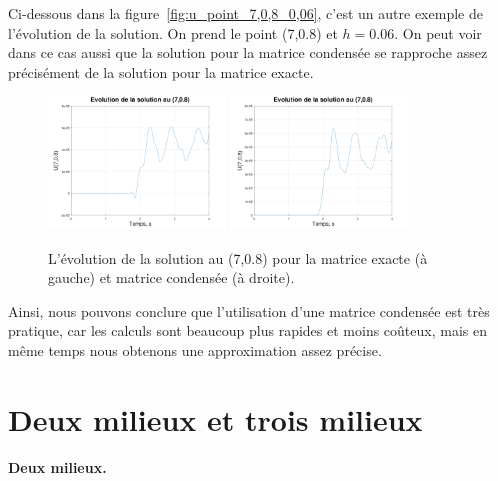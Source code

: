 \documentclass[12pt]{article}
\begin{document}
Ci-dessous dans la figure~\eqref{fig:u_point_7,0,8_0,06}, c'est un autre exemple de l'évolution de la solution. On prend le point (7,0.8) et $h=0.06$. On peut voir dans ce cas aussi que la solution pour la matrice condensée se rapproche assez précisément de la solution pour la matrice exacte.
\begin{figure}[H]
	\hspace{1cm}\includegraphics[width=0.42\textwidth]{images/u_7,0,8_0,06}\hspace{1cm}
	\includegraphics[width=0.42\textwidth]{images/u_7,0,8_0,06_condense}\hspace{1cm}
	\caption{L'évolution de la solution au (7,0.8) pour la matrice exacte (à gauche) et matrice condensée (à droite).}
	\label{fig:u_point_7,0,8_0,06}
\end{figure}

Ainsi, nous pouvons conclure que l'utilisation d'une matrice condensée est très pratique, car les calculs sont beaucoup plus rapides et moins coûteux, mais en même temps nous obtenons une approximation assez précise.

\section{Deux milieux et trois milieux}
\textbf{Deux milieux.}
\end{document}
